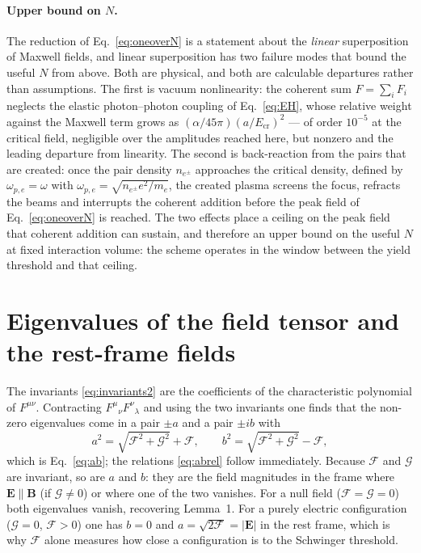\documentclass[aps,prd,reprint,superscriptaddress,nofootinbib,floatfix]{revtex4-2}
\begin{document}
\paragraph{Upper bound on $N$.} The reduction of Eq.~\eqref{eq:oneoverN} is
a statement about the \emph{linear} superposition of Maxwell fields, and
linear superposition has two failure modes that bound the useful $N$ from
above. Both are physical, and both are calculable departures rather than
assumptions. The first is vacuum nonlinearity: the coherent sum
$F=\sum_iF_i$ neglects the elastic photon--photon coupling of
Eq.~\eqref{eq:EH}, whose relative weight against the Maxwell term grows as
$(\alpha/45\pi)(a/E_{\mathrm{cr}})^{2}$ --- of order $10^{-5}$ at the
critical field, negligible over the amplitudes reached here, but nonzero and
the leading departure from linearity. The second is back-reaction from the
pairs that are created: once the pair density $n_{e^\pm}$ approaches the
critical density, defined by $\omega_{p,e}=\omega$ with
$\omega_{p,e}=\sqrt{n_{e^\pm}e^{2}/m_e}$, the created plasma screens the
focus, refracts the beams and interrupts the coherent addition before the
peak field of Eq.~\eqref{eq:oneoverN} is reached. The two effects place a
ceiling on the peak field that coherent addition can sustain, and therefore
an upper bound on the useful $N$ at fixed interaction volume: the scheme
operates in the window between the yield threshold and that ceiling.

\appendix
\section{Eigenvalues of the field tensor and the rest-frame fields}
\label{app:eigen}

The invariants \eqref{eq:invariants2} are the coefficients of the
characteristic polynomial of $F^{\mu\nu}$. Contracting
$F^\mu{}_\nu F^\nu{}_\lambda$ and using the two invariants one finds that the
non-zero eigenvalues come in a pair $\pm a$ and a pair $\pm i b$ with
\begin{equation}
a^2=\sqrt{\mathcal{F}^2+\mathcal{G}^2}+\mathcal{F},\qquad
b^2=\sqrt{\mathcal{F}^2+\mathcal{G}^2}-\mathcal{F},
\end{equation}
which is Eq.~\eqref{eq:ab}; the relations \eqref{eq:abrel} follow immediately.
Because $\mathcal{F}$ and $\mathcal{G}$ are invariant, so are $a$ and $b$: they
are the field magnitudes in the frame where $\mathbf{E}\parallel\mathbf{B}$
(if $\mathcal{G}\neq0$) or where one of the two vanishes. For a null field
($\mathcal{F}=\mathcal{G}=0$) both eigenvalues vanish, recovering Lemma~1.
For a purely electric configuration ($\mathcal{G}=0$, $\mathcal{F}>0$) one has
$b=0$ and $a=\sqrt{2\mathcal{F}}=|\mathbf{E}|$ in the rest frame, which is why
$\mathcal{F}$ alone measures how close a configuration is to the Schwinger
threshold.


\end{document}
